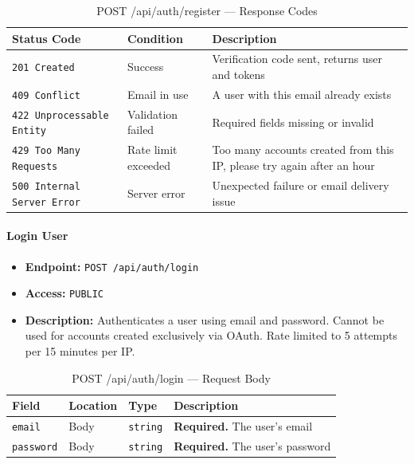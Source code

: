\begin{table}[H]
\centering
\renewcommand{\arraystretch}{1.3}
\begin{tabularx}{\textwidth}{|l|l|X|}
\hline
\textbf{Status Code} & \textbf{Condition} & \textbf{Description} \\
\hline
\texttt{201 Created}      & Success            & Verification code sent, returns user and tokens \\
\hline
\texttt{409 Conflict}     & Email in use       & A user with this email already exists \\
\hline
\texttt{422 Unprocessable Entity} & Validation failed & Required fields missing or invalid \\
\hline
\texttt{429 Too Many Requests} & Rate limit exceeded & Too many accounts created from this IP, please try again after an hour \\
\hline
\texttt{500 Internal Server Error} & Server error & Unexpected failure or email delivery issue \\
\hline
\end{tabularx}
\caption{POST /api/auth/register — Response Codes}
\label{tab:register-responses}
\end{table}
\FloatBarrier

\paragraph{Login User}
\label{subsubsec:login-user}

\begin{itemize}
  \item \textbf{Endpoint:} \texttt{POST /api/auth/login}
  \item \textbf{Access:} \texttt{PUBLIC}
  \item \textbf{Description:} Authenticates a user using email and password. Cannot be used for accounts created exclusively via OAuth. Rate limited to 5 attempts per 15 minutes per IP.
\end{itemize}

\begin{table}[H]
\centering
\renewcommand{\arraystretch}{1.3}
\begin{tabularx}{\textwidth}{|l|l|l|X|}
\hline
\textbf{Field} & \textbf{Location} & \textbf{Type} & \textbf{Description} \\
\hline
\texttt{email}    & Body & \texttt{string} & \textbf{Required.} The user's email \\
\hline
\texttt{password} & Body & \texttt{string} & \textbf{Required.} The user's password \\
\hline
\end{tabularx}
\caption{POST /api/auth/login — Request Body}
\label{tab:login-body}
\end{table}


